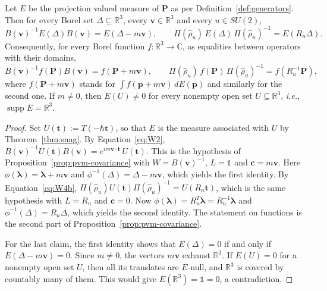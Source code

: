 \begin{lemma}\label{lem:boost-covariance}
	Let $E$ be the projection valued measure of $\mathbf{P}$ as per Definition~\ref{def:generators}. Then for every Borel set $\Delta\subseteq\mathbb{R}^3$, every $\mathbf{v}\in\mathbb{R}^3$ and every $u\in SU(2)$,
	\begin{equation}
		B(\mathbf{v})^{-1}E(\Delta)B(\mathbf{v})=E(\Delta-m\mathbf{v}),\qquad \Pi(\hat\rho_u)\,E(\Delta)\,\Pi(\hat\rho_u)^{-1}=E(R_u\Delta).
	\end{equation}
	Consequently, for every Borel function $f:\mathbb{R}^3\to\mathbb{C}$, as equalities between operators with their domains,
	\begin{equation*}
		B(\mathbf{v})^{-1}f(\mathbf{P})B(\mathbf{v})=f(\mathbf{P}+m\mathbf{v}),\qquad \Pi(\hat\rho_u)\,f(\mathbf{P})\,\Pi(\hat\rho_u)^{-1}=f(R_u^{-1}\mathbf{P}),
	\end{equation*}
	where $f(\mathbf{P}+m\mathbf{v})$ stands for $\int f(\mathbf{p}+m\mathbf{v})\,dE(\mathbf{p})$ and similarly for the second one. If $m\neq0$, then $E(U)\neq0$ for every nonempty open set $U\subseteq\mathbb{R}^3$, \textit{i.e.}, $\operatorname{supp}E=\mathbb{R}^3$.
\end{lemma}

\begin{proof}
	Set $U(\mathbf{t}):=T(-\hbar\mathbf{t})$, so that $E$ is the measure associated with $U$ by Theorem~\ref{thm:snag}. By Equation~\eqref{eq:W2}, $B(\mathbf{v})^{-1}U(\mathbf{t})B(\mathbf{v})=e^{im\mathbf{v}\cdot\mathbf{t}}\,U(\mathbf{t})$. This is the hypothesis of Proposition~\ref{prop:pvm-covariance} with $W=B(\mathbf{v})^{-1}$, $L=\mathbb{1}$ and $\mathbf{c}=m\mathbf{v}$. Here $\phi(\boldsymbol{\lambda})=\boldsymbol{\lambda}+m\mathbf{v}$ and $\phi^{-1}(\Delta)=\Delta-m\mathbf{v}$, which yields the first identity. By Equation~\eqref{eq:W4b}, $\Pi(\hat\rho_u)U(\mathbf{t})\Pi(\hat\rho_u)^{-1}=U(R_u\mathbf{t})$, which is the same hypothesis with $L=R_u$ and $\mathbf{c}=0$. Now $\phi(\boldsymbol{\lambda})=R_u^{T}\boldsymbol{\lambda}=R_u^{-1}\boldsymbol{\lambda}$ and $\phi^{-1}(\Delta)=R_u\Delta$, which yields the second identity. The statement on functions is the second part of Proposition~\ref{prop:pvm-covariance}.
	
	For the last claim, the first identity shows that $E(\Delta)=0$ if and only if $E(\Delta-m\mathbf{v})=0$. Since $m\neq0$, the vectors $m\mathbf{v}$ exhaust $\mathbb{R}^3$. If $E(U)=0$ for a nonempty open set $U$, then all its translates are $E$-null, and $\mathbb{R}^3$ is covered by countably many of them. This would give $E(\mathbb{R}^3)=\mathbb{1}=0$, a contradiction.
\end{proof}

